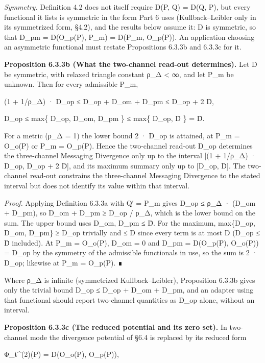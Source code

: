 \documentclass[
]{article}
\begin{document}
\emph{Symmetry.} Definition 4.2 does not itself require D(P, Q) = D(Q,
P), but every functional it lists is symmetric in the form Part 6 uses
(Kullback--Leibler only in its symmetrized form, §4.2), and the results
below assume it: D is symmetric, so that D\_pm = D(O\_p(P), P\_m) =
D(P\_m, O\_p(P)). An application choosing an asymmetric functional must
restate Propositions 6.3.3b and 6.3.3c for it.

\textbf{Proposition 6.3.3b (What the two-channel read-out determines).}
Let D be symmetric, with relaxed triangle constant ρ\_Δ \textless{} ∞,
and let P\_m be unknown. Then for every admissible P\_m,

(1 + 1/ρ\_Δ) · D\_op ≤ D\_op + D\_om + D\_pm ≤ D\_op + 2 D̄,

D\_op ≤ max\{ D\_op, D\_om, D\_pm \} ≤ max\{ D\_op, D̄ \} = D̄.

For a metric (ρ\_Δ = 1) the lower bound 2 · D\_op is attained, at P\_m =
O\_o(P) or P\_m = O\_p(P). Hence the two-channel read-out D\_op
determines the three-channel Messaging Divergence only up to the
interval {[}(1 + 1/ρ\_Δ) · D\_op, D\_op + 2 D̄{]}, and its maximum
summary only up to {[}D\_op, D̄{]}. The two-channel read-out constrains
the three-channel Messaging Divergence to the stated interval but does
not identify its value within that interval.

\emph{Proof.} Applying Definition 6.3.3a with Q′ = P\_m gives D\_op ≤
ρ\_Δ · (D\_om + D\_pm), so D\_om + D\_pm ≥ D\_op / ρ\_Δ, which is the
lower bound on the sum. The upper bound uses D\_om, D\_pm ≤ D̄. For the
maximum, max\{D\_op, D\_om, D\_pm\} ≥ D\_op trivially and ≤ D̄ since
every term is at most D̄ (D\_op ≤ D̄ included). At P\_m = O\_o(P), D\_om =
0 and D\_pm = D(O\_p(P), O\_o(P)) = D\_op by the symmetry of the
admissible functionals in use, so the sum is 2 · D\_op; likewise at P\_m
= O\_p(P). ∎

Where ρ\_Δ is infinite (symmetrized Kullback--Leibler), Proposition
6.3.3b gives only the trivial bound D\_op ≤ D\_op + D\_om + D\_pm, and
an adapter using that functional should report two-channel quantities as
D\_op alone, without an interval.

\textbf{Proposition 6.3.3c (The reduced potential and its zero set).} In
two-channel mode the divergence potential of §6.4 is replaced by its
reduced form

Φ\_t\^{}(2)(P) = D(O\_o(P), O\_p(P)),
\end{document}
